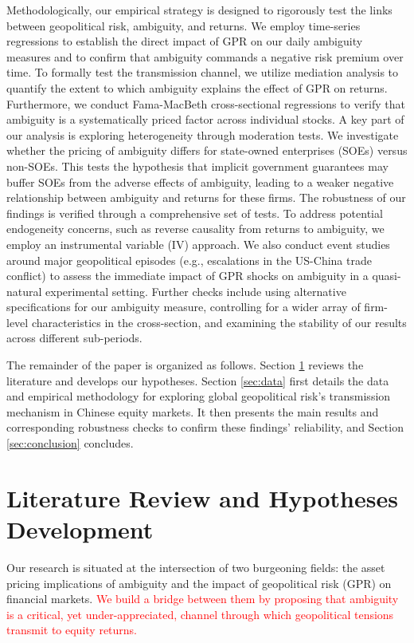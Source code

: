 \documentclass[preprint,12pt,authoryear]{elsarticle}
\begin{document}
Methodologically, our empirical strategy is designed to rigorously test the links between geopolitical risk, ambiguity, and returns. We employ time-series regressions to establish the direct impact of GPR on our daily ambiguity measures and to confirm that ambiguity commands a negative risk premium over time. To formally test the transmission channel, we utilize mediation analysis to quantify the extent to which ambiguity explains the effect of GPR on returns. Furthermore, we conduct Fama-MacBeth cross-sectional regressions to verify that ambiguity is a systematically priced factor across individual stocks. A key part of our analysis is exploring heterogeneity through moderation tests. We investigate whether the pricing of ambiguity differs for state-owned enterprises (SOEs) versus non-SOEs. This tests the hypothesis that implicit government guarantees may buffer SOEs from the adverse effects of ambiguity, leading to a weaker negative relationship between ambiguity and returns for these firms. The robustness of our findings is verified through a comprehensive set of tests. To address potential endogeneity concerns, such as reverse causality from returns to ambiguity, we employ an instrumental variable (IV) approach. We also conduct event studies around major geopolitical episodes (e.g., escalations in the US-China trade conflict) to assess the immediate impact of GPR shocks on ambiguity in a quasi-natural experimental setting. Further checks include using alternative specifications for our ambiguity measure, controlling for a wider array of firm-level characteristics in the cross-section, and examining the stability of our results across different sub-periods.

The remainder of the paper is organized as follows. Section \ref{sec:literature} reviews the literature and develops our hypotheses. Section \ref{sec:data} first details the data and empirical methodology for exploring global geopolitical risk’s transmission mechanism in Chinese equity markets. It then presents the main results and corresponding robustness checks to confirm these findings’ reliability, and Section \ref{sec:conclusion} concludes.

\section{Literature Review and Hypotheses Development}
\label{sec:literature}

Our research is situated at the intersection of two burgeoning fields: the asset pricing implications of ambiguity and the impact of geopolitical risk (GPR) on financial markets. \textcolor{red}{ We build a bridge between them by proposing that ambiguity is a critical, yet under-appreciated, channel through which geopolitical tensions transmit to equity returns.}
\end{document}
